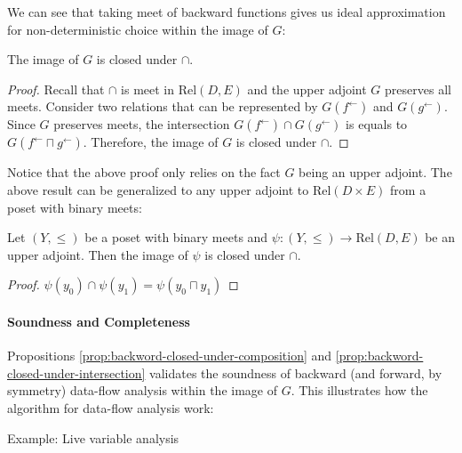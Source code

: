 \documentclass{llncs}
\newcommand{\Rel}{\mathrm{Rel}}
\newcommand{\fb}{{f^{\leftarrow}}}
\newcommand{\gb}{{g^{\leftarrow}}}
\newcommand{\meet}{\sqcap}
\begin{document}
    We can see that taking meet of backward functions gives us ideal approximation for non-deterministic choice within the image of $G$:
    \begin{proposition}\label{prop:backword-closed-under-intersection}
      The image of $G$ is closed under $\cap$.
      \begin{proof}
        Recall that $\cap$ is meet in $\Rel(D , E)$ and the upper adjoint $G$ preserves all meets.
        Consider two relations that can be represented by $G(\fb)$ and $G(\gb)$.
        Since $G$ preserves meets, the intersection $G(\fb) \cap G(\gb)$ is equals to $G(\fb \meet \gb)$. Therefore, the image of $G$ is closed under $\cap$.
      \end{proof}
    \end{proposition}
    Notice that the above proof only relies on the fact $G$ being an upper adjoint.
    The above result can be generalized to any upper adjoint to $\Rel(D \times E)$ from a poset with binary meets:

    \begin{lemma}\label{lem:any-fixedpoint-of-galois-connection-closed-under-intersection}
      Let $(Y, \leq)$ be a poset with binary meets and $\psi : (Y , \leq) \to \Rel(D, E)$ be an upper adjoint.
      Then the image of $\psi$ is closed under $\cap$.
      \begin{proof}
        $\psi(y_{0}) \cap \psi(y_{1}) = \psi(y_{0} \meet y_{1})$
      \end{proof}
    \end{lemma}

  \paragraph{Soundness and Completeness}
  Propositions \ref{prop:backword-closed-under-composition} and \ref{prop:backword-closed-under-intersection} validates the soundness of backward (and forward, by symmetry) data-flow analysis within the image of $G$.  This illustrates how the algorithm for data-flow analysis work:

  Example: Live variable analysis
   \begin{center}
  \end{center}
\end{document}

